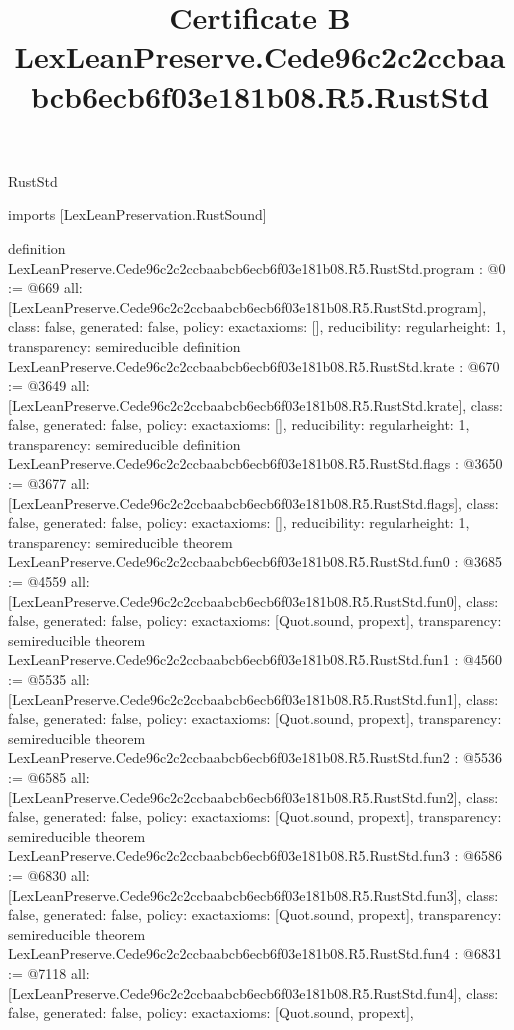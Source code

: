 \begin{lexlean}{RustStd}
\title{Certificate B LexLeanPreserve.Cede96c2c2ccbaabcb6ecb6f03e181b08.R5.RustStd}
\begin{coremodule}
imports [LexLeanPreservation.RustSound]

definition LexLeanPreserve.Cede96c2c2ccbaabcb6ecb6f03e181b08.R5.RustStd.program : @0 := @669 {
  all: [LexLeanPreserve.Cede96c2c2ccbaabcb6ecb6f03e181b08.R5.RustStd.program],
  class: false,
  generated: false,
  policy: exact{axioms: []},
  reducibility: regular{height: 1},
  transparency: semireducible
}
definition LexLeanPreserve.Cede96c2c2ccbaabcb6ecb6f03e181b08.R5.RustStd.krate : @670 := @3649 {
  all: [LexLeanPreserve.Cede96c2c2ccbaabcb6ecb6f03e181b08.R5.RustStd.krate],
  class: false,
  generated: false,
  policy: exact{axioms: []},
  reducibility: regular{height: 1},
  transparency: semireducible
}
definition LexLeanPreserve.Cede96c2c2ccbaabcb6ecb6f03e181b08.R5.RustStd.flags : @3650 := @3677 {
  all: [LexLeanPreserve.Cede96c2c2ccbaabcb6ecb6f03e181b08.R5.RustStd.flags],
  class: false,
  generated: false,
  policy: exact{axioms: []},
  reducibility: regular{height: 1},
  transparency: semireducible
}
theorem LexLeanPreserve.Cede96c2c2ccbaabcb6ecb6f03e181b08.R5.RustStd.fun0 : @3685 := @4559 {
  all: [LexLeanPreserve.Cede96c2c2ccbaabcb6ecb6f03e181b08.R5.RustStd.fun0],
  class: false,
  generated: false,
  policy: exact{axioms: [Quot.sound, propext]},
  transparency: semireducible
}
theorem LexLeanPreserve.Cede96c2c2ccbaabcb6ecb6f03e181b08.R5.RustStd.fun1 : @4560 := @5535 {
  all: [LexLeanPreserve.Cede96c2c2ccbaabcb6ecb6f03e181b08.R5.RustStd.fun1],
  class: false,
  generated: false,
  policy: exact{axioms: [Quot.sound, propext]},
  transparency: semireducible
}
theorem LexLeanPreserve.Cede96c2c2ccbaabcb6ecb6f03e181b08.R5.RustStd.fun2 : @5536 := @6585 {
  all: [LexLeanPreserve.Cede96c2c2ccbaabcb6ecb6f03e181b08.R5.RustStd.fun2],
  class: false,
  generated: false,
  policy: exact{axioms: [Quot.sound, propext]},
  transparency: semireducible
}
theorem LexLeanPreserve.Cede96c2c2ccbaabcb6ecb6f03e181b08.R5.RustStd.fun3 : @6586 := @6830 {
  all: [LexLeanPreserve.Cede96c2c2ccbaabcb6ecb6f03e181b08.R5.RustStd.fun3],
  class: false,
  generated: false,
  policy: exact{axioms: [Quot.sound, propext]},
  transparency: semireducible
}
theorem LexLeanPreserve.Cede96c2c2ccbaabcb6ecb6f03e181b08.R5.RustStd.fun4 : @6831 := @7118 {
  all: [LexLeanPreserve.Cede96c2c2ccbaabcb6ecb6f03e181b08.R5.RustStd.fun4],
  class: false,
  generated: false,
  policy: exact{axioms: [Quot.sound, propext]},
}
\end{coremodule}
\end{lexlean}
